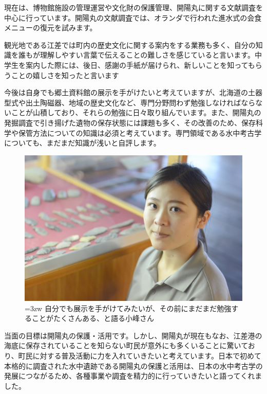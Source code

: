 \documentclass[a4j,11pt,twocolumn,openany]{jsbook}
\begin{document}
現在は、博物館施設の管理運営や文化財の保護管理、開陽丸に関する文献調査を中心に行っています。開陽丸の文献調査では、オランダで行われた進水式の会食メニューの復元を試みます。

観光地である江差では町内の歴史文化に関する案内をする業務も多く、自分の知識を誰もが理解しやすい言葉で伝えることの難しさを感じていると言います。中学生を案内した際には、後日、感謝の手紙が届けられ、新しいことを知ってもらうことの嬉しさを知ったと言います

今後は自身でも郷土資料館の展示を手がけたいと考えていますが、北海道の土器型式や出土陶磁器、地域の歴史文化など、専門分野問わず勉強しなければならないことが山積しており、それらの勉強に日々取り組んでいます。また、開陽丸の発掘調査で引き揚げた遺物の保存状態には課題も多く、その改善のため、保存科学や保管方法についての知識は必須と考えています。専門領域である水中考古学についても、まだまだ知識が浅いと自評します。

\begin{figure}[ht]
	\centering
	\includegraphics[width=\linewidth]{fig/02_Komine/Komine02.png}
	\caption{\hangindent=3zw
		自分でも展示を手がけてみたいが、その前にまだまだ勉強することがたくさんある、と語る小峰さん}
	\label{}
	\vspace{-1\baselineskip}
\end{figure}

当面の目標は開陽丸の保護・活用です。しかし、開陽丸が現在もなお、江差港の海底に保存されていることを知らない町民が意外にも多くいることに驚いており、町民に対する普及活動に力を入れていきたいと考えています。日本で初めて本格的に調査された水中遺跡である開陽丸の保護と活用は、日本の水中考古学の発展につながるため、各種事業や調査を精力的に行っていきたいと語ってくれました。
\end{document}

